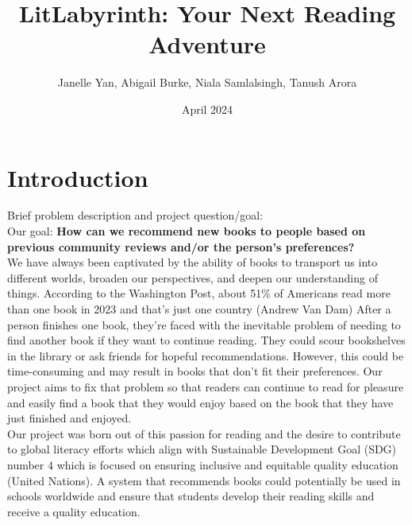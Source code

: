\documentclass{article}
\title{LitLabyrinth: Your Next Reading Adventure}
\author{Janelle Yan, Abigail Burke, Niala Samlalsingh, Tanush Arora}
\date{April 2024}
\begin{document}
\maketitle

\section{Introduction}
Brief problem description and project question/goal: \\
Our goal: \textbf{How can we recommend new books to people based on previous community 
reviews and/or the person's preferences?} \\
\indent We have always been captivated by the ability of books to transport us into 
different worlds, broaden our perspectives, and deepen our understanding of things. 
According to the Washington Post, about 51\% of Americans read more than one book in 2023 
and that's just one country (Andrew Van Dam) After a person finishes one book, they're faced with the 
inevitable problem of needing to find another book if they want to continue reading. They 
could scour bookshelves in the library or ask friends for hopeful recommendations. However, 
this could be time-consuming and may result in books that don't fit their preferences. Our project aims to fix that problem so that readers can continue to read for pleasure and easily find a book that they would enjoy based on the book that they have just finished and enjoyed. \\
\indent Our project was born out of this passion for reading and the desire to contribute to global literacy efforts which align with Sustainable Development Goal (SDG) number 4 which is focused on ensuring inclusive and equitable quality education (United Nations). A system that recommends books could potentially be used in schools worldwide and ensure that students develop their reading skills and receive a quality education. 
\end{document}
